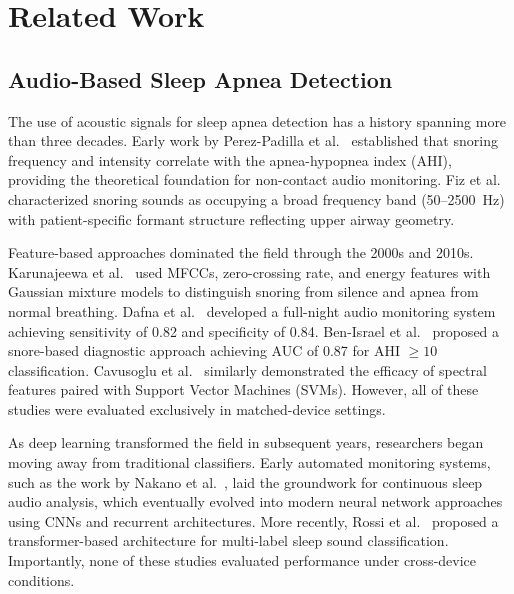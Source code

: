 \documentclass[conference]{IEEEtran}
\begin{document}
\section{Related Work}

\subsection{Audio-Based Sleep Apnea Detection}

The use of acoustic signals for sleep apnea detection has a history spanning more
than three decades. Early work by Perez-Padilla et al.~\cite{perezpadilla1993}
established that snoring frequency and intensity correlate with the apnea-hypopnea
index (AHI), providing the theoretical foundation for non-contact audio monitoring.
Fiz et al.~\cite{fiz1996} characterized snoring sounds as occupying a broad frequency
band (50--2500~Hz) with patient-specific formant structure reflecting upper airway
geometry.

Feature-based approaches dominated the field through the 2000s and 2010s. Karunajeewa
et al.~\cite{karunajeewa2008} used MFCCs, zero-crossing rate, and energy features
with Gaussian mixture models to distinguish snoring from silence and apnea from normal
breathing. Dafna et al.~\cite{dafna2013} developed a full-night audio monitoring
system achieving sensitivity of 0.82 and specificity of 0.84. Ben-Israel et
al.~\cite{benisrael2012} proposed a snore-based diagnostic approach achieving AUC of
0.87 for AHI $\geq 10$ classification. Cavusoglu et al.~\cite{cavusoglu2009} similarly 
demonstrated the efficacy of spectral features paired with Support Vector Machines (SVMs). 
However, all of these studies were evaluated exclusively in matched-device settings.

As deep learning transformed the field in subsequent years, researchers began moving 
away from traditional classifiers. Early automated monitoring systems, such as the 
work by Nakano et al.~\cite{nakano2012}, laid the groundwork for continuous sleep 
audio analysis, which eventually evolved into modern neural network approaches using 
CNNs and recurrent architectures. More recently, Rossi et al.~\cite{rossi2023} proposed
a transformer-based architecture for multi-label sleep sound classification.
Importantly, none of these studies evaluated performance under cross-device conditions.
\end{document}
